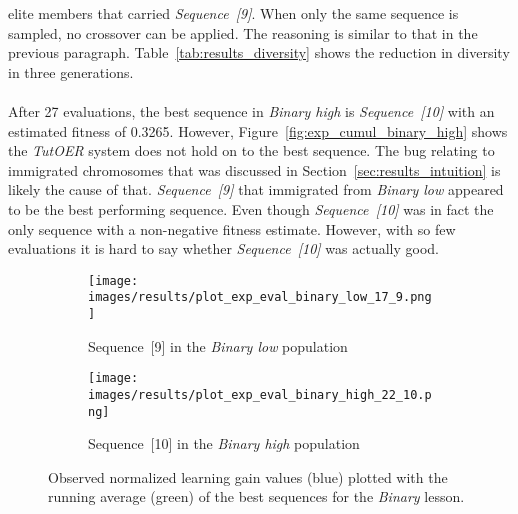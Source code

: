 elite members that carried \emph{Sequence~[9]}. When only the same sequence is
sampled, no crossover can be applied. The reasoning is similar to that in the
previous paragraph. Table~\ref{tab:results_diversity} shows the reduction in
diversity in three generations.\\\\
\noindent
After 27 evaluations, the best sequence in \emph{Binary high} is
\emph{Sequence~[10]} with an estimated fitness of 0.3265. However,
Figure~\ref{fig:exp_cumul_binary_high} shows the \emph{TutOER} system does
not hold on to the best sequence. The bug relating to immigrated chromosomes
that was discussed in Section~\ref{sec:results_intuition} is likely the cause
of that. \emph{Sequence~[9]} that immigrated from \emph{Binary low} appeared to
be the best performing sequence. Even though \emph{Sequence~[10]} was in fact
the only sequence with a non-negative fitness estimate. However, with so few
evaluations it is hard to say whether \emph{Sequence~[10]} was actually good.

\begin{figure}[ht]
	\begin{subfigure}{0.9\linewidth}
	\centering
	\texttt{[image: images/results/plot\_exp\_eval\_binary\_low\_17\_9.png]}
	\caption{Sequence~[9] in the \emph{Binary low} population}
	\label{fig:exp_eval_binary_low_17}
	\end{subfigure}
	\hfill
	\begin{subfigure}{0.9\linewidth}
	\centering
	\texttt{[image: images/results/plot\_exp\_eval\_binary\_high\_22\_10.png]}
	\caption{Sequence~[10] in the \emph{Binary high} population}
	\label{fig:exp_eval_binary_high_10}
	\end{subfigure}
	\caption[Evaluations of the best sequences in Binary]{Observed normalized learning gain values (blue) plotted with the
		running average (green) of the best sequences for the \emph{Binary}
	lesson.}
	\label{fig:exp_eval_binary}
\end{figure}

